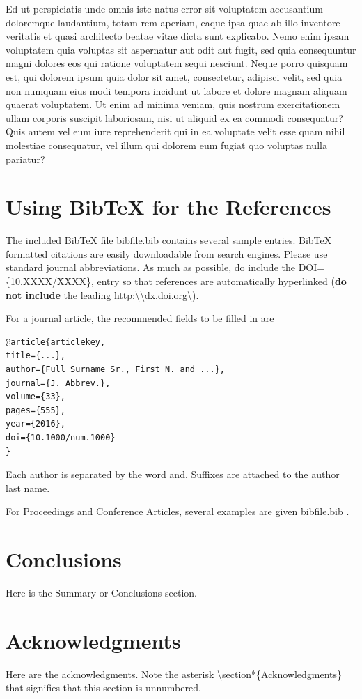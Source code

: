 \documentclass[10pt,a4paper,twoside]{article}
\begin{document}
Ed ut perspiciatis unde omnis iste natus error sit voluptatem accusantium doloremque laudantium, totam rem aperiam, eaque ipsa quae ab illo inventore veritatis et quasi architecto beatae vitae dicta sunt explicabo. Nemo enim ipsam voluptatem quia voluptas sit aspernatur aut odit aut fugit, sed quia consequuntur magni dolores eos qui ratione voluptatem sequi nesciunt. Neque porro quisquam est, qui dolorem ipsum quia dolor sit amet, consectetur, adipisci velit, sed quia non numquam eius modi tempora incidunt ut labore et dolore magnam aliquam quaerat voluptatem. Ut enim ad minima veniam, quis nostrum exercitationem ullam corporis suscipit laboriosam, nisi ut aliquid ex ea commodi consequatur? Quis autem vel eum iure reprehenderit qui in ea voluptate velit esse quam nihil molestiae consequatur, vel illum qui dolorem eum fugiat quo voluptas nulla pariatur?

\section{Using BibTeX for the References}
The included BibTeX file {\ttfamily bibfile}.{\ttfamily bib} contains several sample entries. BibTeX formatted citations are easily downloadable from search engines. Please use standard journal abbreviations. As much as possible, do include the {\ttfamily DOI}=\{{\ttfamily 10.XXXX}/{\ttfamily XXXX}\}{\ttfamily ,} entry so that references are automatically hyperlinked (\textbf{do not include} the leading {\ttfamily http}:\textbackslash\textbackslash{\ttfamily dx.doi.org}\textbackslash).

For a journal article, the recommended fields to be filled in are
\begin{verbatim}
@article{articlekey,
title={...},
author={Full Surname Sr., First N. and ...},
journal={J. Abbrev.},
volume={33},
pages={555},
year={2016},
doi={10.1000/num.1000}
}
\end{verbatim}
Each author is separated by the word {\ttfamily and}. Suffixes are attached to the author last name.

For Proceedings and Conference Articles, several examples are given {\ttfamily bibfile}.{\ttfamily bib} \cite{proceedingskey1,proceedingskey2}.

\section{Conclusions}
Here is the Summary or Conclusions section.

\section*{Acknowledgments}
Here are the acknowledgments. Note the asterisk \textbackslash{\ttfamily section*}\{{\ttfamily Acknowledgments}\} that signifies that this section is unnumbered.
\end{document}
